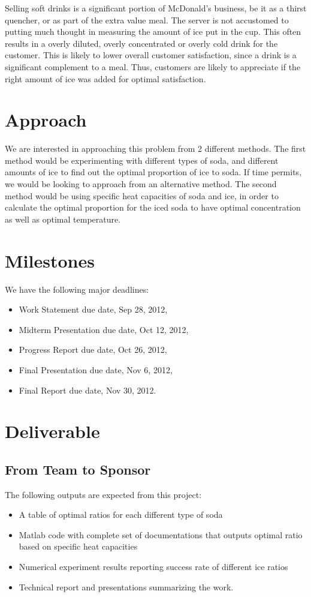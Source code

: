 \documentclass[12pt,letterpaper]{article}
\theoremstyle{definition}
\begin{document}
Selling soft drinks is a significant portion of McDonald's business, be it as a thirst quencher, or as part of the extra value meal. The server is not accustomed to putting much thought in measuring the amount of ice put in the cup. This often results in a overly diluted, overly concentrated or overly cold drink for the customer. This is likely to lower overall customer satisfaction, since a drink is a significant complement to a meal. Thus, customers are likely to appreciate if the right amount of ice was added for optimal satisfaction.

\section{Approach}
We are interested in approaching this problem from 2 different methods. The first method would be experimenting with different types of soda, and different amounts of ice to find out the optimal proportion of ice to soda. If time permits, we would be looking to approach from an alternative method. The second method would be using specific heat capacities of soda and ice, in order to calculate the optimal proportion for the iced soda to have optimal concentration as well as optimal temperature.

\section{Milestones}
We have the following major deadlines:
\begin{itemize}
    \item Work Statement due date, Sep 28, 2012,
    \item Midterm Presentation due date, Oct 12, 2012,
    \item Progress Report due date, Oct 26, 2012,
    \item Final Presentation due date, Nov 6, 2012,
    \item Final Report due date, Nov 30, 2012.
\end{itemize}

\section{Deliverable}
\subsection{From Team to Sponsor} %
The following outputs are expected from this project:
\begin{itemize}
    \item A table of optimal ratios for each different type of soda
    \item Matlab code with complete set of documentations that outputs optimal ratio based on specific heat capacities
    \item Numerical experiment results reporting success rate of different ice ratios
    \item Technical report and presentations summarizing the work. 
\end{itemize}
\end{document}

